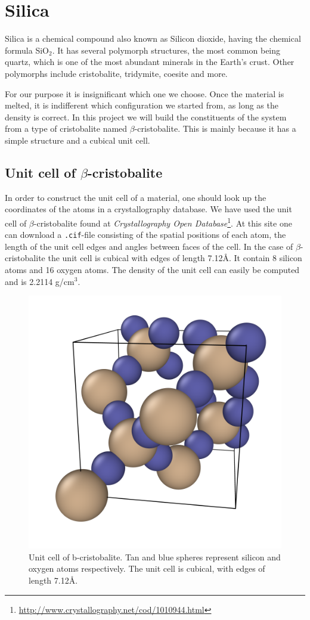 \documentclass[twoside,english]{uiofysmaster}
\begin{document}
\section{Silica}
Silica is a chemical compound also known as Silicon dioxide, having the chemical formula SiO$_2$. It has several polymorph structures, the most common being quartz, which is one of the most abundant minerals in the Earth's crust. Other polymorphs include cristobalite, tridymite, coesite and more.    

For our purpose it is insignificant which one we choose. Once the material is melted, it is indifferent which configuration we started from, as long as the density is correct.
In this project we will build the constituents of the system from a type of cristobalite named $\beta$-cristobalite. This is mainly because it has a simple structure and a cubical unit cell.


\subsection{Unit cell of $\beta$-cristobalite}
In order to construct the unit cell of a material, one should look up the coordinates of the atoms in a crystallography database. We have used the unit cell of $\beta$-cristobalite found at \textit{Crystallography Open Database}\footnote{\href{http://www.crystallography.net/cod/1010944.html}{http://www.crystallography.net/cod/1010944.html}}. At this site one can download a \texttt{.cif}-file consisting of the spatial positions of each atom, the length of the unit cell edges and angles between faces of the cell. In the case of $\beta$-cristobalite the unit cell is cubical with edges of length 7.12Å. It contain 8 silicon atoms and 16 oxygen atoms. The density of the unit cell can easily be computed and is 2.2114 g/cm$^3$.

\begin{figure}
	\centering
	\includegraphics[width=0.7\linewidth]{figures/unitcell/unitcell.png}
	\caption{Unit cell of b-cristobalite. Tan and blue spheres represent silicon and oxygen atoms respectively. The unit cell is cubical, with edges of length 7.12Å.}
	\label{fig:unitcellbcristobalite}
\end{figure}
\end{document}
